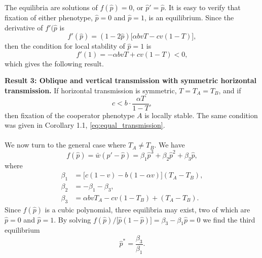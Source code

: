 \documentclass[12pt]{extarticle}
\begin{document}
The equilibria are solutions of $f(\hat{p})=0$, or $\hat{p}' = \hat{p}$.
It is easy to verify that fixation of either phenotype, $\hat{p} =  0$ and $\hat{p} = 1$, is an equilibrium.
Since the derivative of $f'(\hat{p}$ is 
\begin{equation}
f'(\hat{p})=(1-2\hat{p})\big[\alpha bvT - cv(1-T)\big],
\end{equation}
then the condition for local stability of $\hat{p}=1$ is
\begin{equation} \label{eq:derivative_of_phattag-phat}
	f'(1) =
	-\alpha bvT + cv(1-T) < 0,
\end{equation}
which gives the following result.

\textbf{Result 3: Oblique and vertical transmission with symmetric horizontal transmission.}
If horizontal transmission is symmetric, $T = T_A = T_B$, and if
\begin{equation} \label{eq:oblique_and_vertic_result2}
	c < b \cdot \frac{\alpha T}{1-T},
\end{equation}
then fixation of the cooperator phenotype $A$ is locally stable.
The same condition was given in Corollary 1.1, \autoref{eq:equal_transmission}.
\\
\\
We now turn to the general case where $T_A \neq T_B$. We have
\begin{equation} \label{eq:general_case_polynomial}
  f(\hat{p}) = \bar{w}(\hat{p}'-\hat{p}) =
  \beta_1 \hat{p}^3 + \beta_2 \hat{p}^2 + \beta_3 \hat{p},
\end{equation}
where 
\begin{equation} \label{eq:polynomial_coefficients}
\begin{aligned}
\beta_1 &= \big[c(1-v) - b (1-\alpha v)\big] (T_A-T_B) , \\
\beta_2 &= -\beta_1 -\beta_3 ,  \\
\beta_3 &= \alpha bvT_A - cv(1-T_B) + (T_A-T_B) .
\end{aligned}
\end{equation}
Since $f(\hat{p})$ is a cubic polynomial, three equilibria may exist, two of which are
$\hat{p} = 0 $ and $\hat{p} = 1$.
By solving $f(\hat{p})/\big[\hat{p}(1-\hat{p})\big] = \beta_3 -\beta_1 \hat{p} = 0$ we  find the third equilibrium
\begin{equation} \label{eq:oblique_and_vertic_result}
  \hat{p}^* =  
  \frac{\beta_3}{\beta_1}.
\end{equation}
\end{document}
